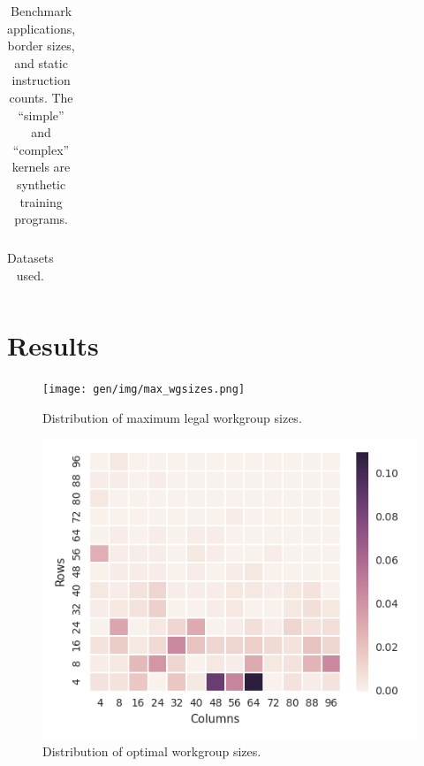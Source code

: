 \begin{table}
\footnotesize
\centering
\begin{tabular}{| l | l | l | l | l | l |}
\hline

\hline
\end{tabular}
\caption{%
  Benchmark applications, border sizes, and static instruction counts.
  The ``simple'' and ``complex'' kernels are synthetic training
  programs. %
}
\label{tab:kernels}
\end{table}

\begin{table}
\footnotesize
\centering
\begin{tabular}{| l | l | l | l |}
\hline

\hline
\end{tabular}
\caption{%
  Datasets used.%
}
\label{tab:datasets}
\end{table}

\section{Results}

\begin{figure}
\centering
\texttt{[image: gen/img/max\_wgsizes.png]}
\caption{%
  Distribution of maximum legal workgroup sizes.%
}
\end{figure}

\begin{figure}
\centering
\includegraphics{gen/img/oracle_param_space.png}
\caption{%
  Distribution of optimal workgroup sizes.%
}
\end{figure}

